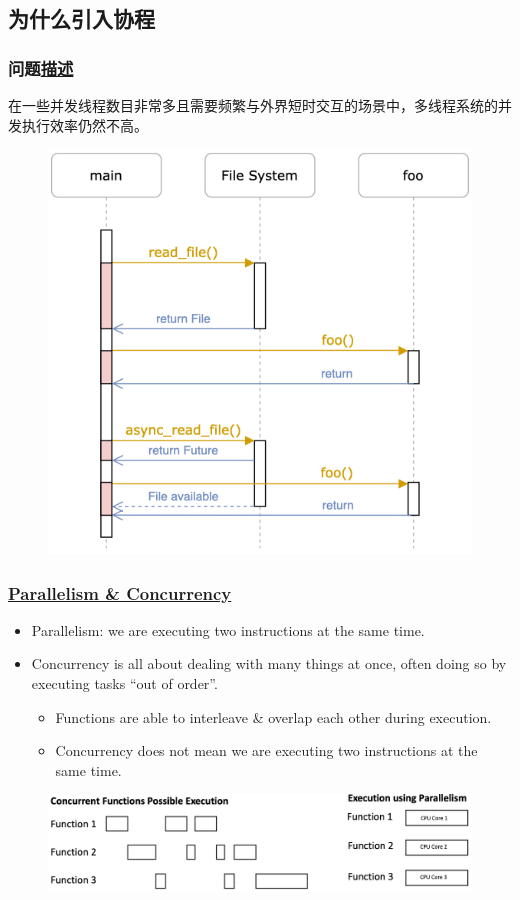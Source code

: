 \subsection{为什么引入协程}
% 
\begin{frame}[fragile]
    \frametitle{问题\href{https://os.phil-opp.com/async-await/\#example}{描述}}
% 
在一些并发线程数目非常多且需要频繁与外界短时交互的场景中，多线程系统的并发执行效率仍然不高。 \pause
% 

  \begin{figure}
    \centering
    \includegraphics[width=0.45\linewidth]{figs/async-example.png}
  \end{figure}



% 

\end{frame}
\begin{frame}[fragile]
    \frametitle{\href{https://www.cs.montana.edu/paxton/classes/2020/lectures/concurrency/slides.pptx}{Parallelism \& Concurrency}}

    \begin{itemize}
        \item Parallelism: we are executing two instructions at the same time.
        \item Concurrency is all about dealing with many things at once, often doing so by executing tasks “out of order”. \pause
        \begin{itemize}
            \item Functions are able to interleave \& overlap each other during execution.
            \item Concurrency does not mean we are executing two instructions at the same time.
        \end{itemize}
    \end{itemize} \pause


  \begin{figure}
    \centering
    \includegraphics[width=0.9\linewidth]{figs/parallel-concurrnt.png}
  \end{figure}
\end{frame}
